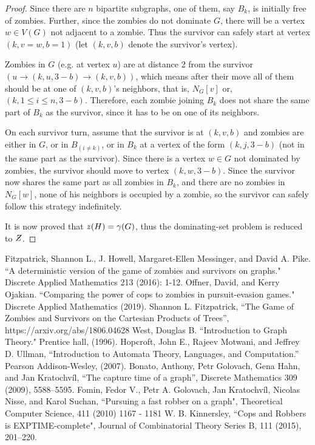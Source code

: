 \documentclass[1p]{elsarticle}
\newcommand{\NPZ}{\ooalign{$Z$\cr\hfil\rule[.8ex]{.3em}{.09ex}\hfil\cr}}
\newcommand{\zn}{\ooalign{$z$\cr\hfil\rule[.5ex]{.2em}{.08ex}\hfil\cr}}
\begin{document}
\begin{proof}
		Since there are $n$ bipartite subgraphs, one of them, say $B_k$, is initially free of zombies. Further, since
		the zombies do not dominate $G$, there will be a vertex $w \in V (G)$ not adjacent to a zombie. Thus the
		survivor can safely start at vertex $(k,v = w,b = 1)$ (let $(k,v,b)$ denote the survivor's vertex).

		Zombies in $G$ (e.g. at vertex $u$) are at distance 2 from the survivor $(u \rightarrow (k,u,3 - b) \rightarrow
		(k,v,b))$, which means after their move all of them should be at one of $(k,v,b)$'s neighbors, that is, $N_G[v]
		$ or, $ (k,1 \leq i \leq n,3 - b)$. Therefore, each zombie joining $B_k$ does not share the same part of $B_k$
		as the survivor, since it has to be on one of its neighbors.
		
		On each survivor turn, assume that the survivor is at $(k,v,b)$ and zombies are either in $G$, or in $B_{(i \neq
		k)}$, or in $B_k$ at a vertex of the form $(k,j,3-b)$ (not in the same part as the survivor). Since there is a
		vertex $w \in G$ not dominated by zombies, the survivor should move to vertex $(k,w,3-b)$. Since the survivor
		now shares the same part as all zombies in $B_k$, and there are no zombies in $N_G[w]$, none of his neighbors is
		occupied by a zombie, so the survivor can safely follow this strategy indefinitely.

		It is now proved that $\zn(H) = \gamma(G)$, thus the dominating-set problem is reduced to $\NPZ$.

	\end{proof}

	
\begin{thebibliography}{999}
	
	Fitzpatrick, Shannon L., J. Howell, Margaret-Ellen Messinger, and David A. Pike. ``A deterministic version of the
	game of zombies and survivors on graphs." Discrete Applied Mathematics 213 (2016): 1-12.
	Offner, David, and Kerry Ojakian. ``Comparing the power of cops to zombies in pursuit-evasion games." Discrete
	Applied Mathematics (2019).
	Shannon L. Fitzpatrick, ``The Game of Zombies and Survivors on the Cartesian Products of Trees'', https://arxiv.org/abs/1806.04628
	West, Douglas B. ``Introduction to Graph Theory." Prentice hall, (1996).
	Hopcroft, John E., Rajeev Motwani, and Jeffrey D. Ullman, ``Introduction to Automata Theory, Languages, and
	Computation.'' Pearson Addison-Wesley, (2007).
	Bonato, Anthony, Petr Golovach, Gena Hahn, and Jan Kratochvíl, ``The capture time of a graph'', Discrete Mathematics
	309 (2009), 5588–5595.
	Fomin, Fedor V., Petr A. Golovach, Jan Kratochvíl, Nicolas Nisse, and Karol Suchan, ``Pursuing a fast robber on a
	graph", Theoretical Computer Science, 411 (2010) 1167 - 1181
	W. B. Kinnersley, ``Cops and Robbers is EXPTIME-complete", Journal of Combinatorial Theory Series B, 111 (2015), 201–220.
\end{thebibliography}
	
\end{document}
